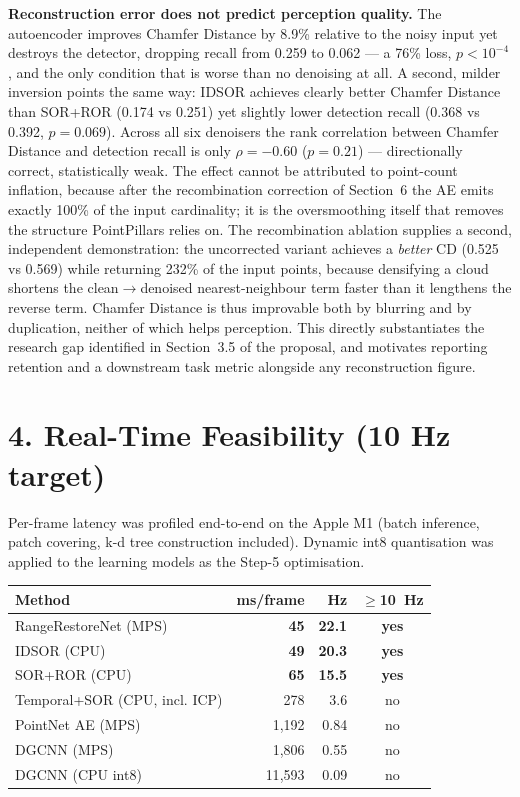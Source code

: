 \documentclass[12pt,a4paper]{article}
\begin{document}
\textbf{Reconstruction error does not predict perception quality.} The
autoencoder improves Chamfer Distance by 8.9\% relative to the noisy input
yet destroys the detector, dropping recall from 0.259 to 0.062 --- a 76\%
loss, $p<10^{-4}$, and the only condition that is worse than no denoising at
all. A second, milder inversion points the same way: IDSOR achieves clearly
better Chamfer Distance than SOR+ROR (0.174 vs 0.251) yet slightly lower
detection recall (0.368 vs 0.392, $p=0.069$). Across all six denoisers the
rank correlation between Chamfer Distance and detection recall is only
$\rho=-0.60$ ($p=0.21$) --- directionally correct, statistically weak. The
effect cannot be attributed to point-count inflation, because
after the recombination correction of Section~6 the AE emits exactly 100\%
of the input cardinality; it is the oversmoothing itself that removes the
structure PointPillars relies on. The recombination ablation supplies a
second, independent demonstration: the uncorrected variant achieves a
\emph{better} CD (0.525 vs 0.569) while returning 232\% of the input
points, because densifying a cloud shortens the clean$\rightarrow$denoised
nearest-neighbour term faster than it lengthens the reverse term. Chamfer
Distance is thus improvable both by blurring and by duplication, neither of
which helps perception. This directly substantiates the research gap
identified in Section~3.5 of the proposal, and motivates reporting
retention and a downstream task metric alongside any reconstruction
figure.

\section*{4. Real-Time Feasibility (10 Hz target)}

Per-frame latency was profiled end-to-end on the Apple M1 (batch inference,
patch covering, k-d tree construction included). Dynamic int8 quantisation
was applied to the learning models as the Step-5 optimisation.

\begin{center}
\begin{tabular}{lrrc}
\toprule
\textbf{Method} & \textbf{ms/frame} & \textbf{Hz} & \textbf{$\geq$10~Hz}\\
\midrule
RangeRestoreNet (MPS)        & \textbf{45}    & \textbf{22.1} & \textbf{yes}\\
IDSOR (CPU)                  & \textbf{49}    & \textbf{20.3} & \textbf{yes}\\
SOR+ROR (CPU)                & \textbf{65}    & \textbf{15.5} & \textbf{yes}\\
Temporal+SOR (CPU, incl. ICP)& 278    & 3.6  & no\\
PointNet AE (MPS)            & 1{,}192 & 0.84 & no\\
DGCNN (MPS)                  & 1{,}806 & 0.55 & no\\
DGCNN (CPU int8)             & 11{,}593 & 0.09 & no\\
\bottomrule
\end{tabular}
\end{center}
\end{document}
